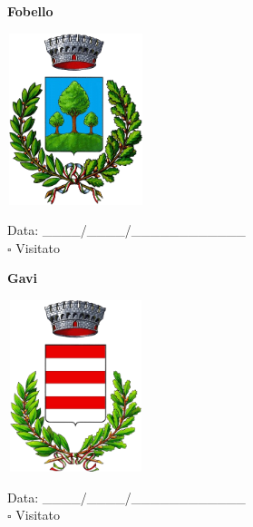\documentclass[a5paper,12pt]{article}
\begin{document}
\newpage

\noindent
\begin{minipage}[t]{0.45\textwidth}
    \begin{center}
        \textbf{Fobello}
    \end{center}
    \vspace{-0.5cm} %
    \begin{center}
        \includegraphics[height= 5cm, width=4cm]{Piemonte/Stemma Fobello.png}
    \end{center}
    \vspace{-0.4cm} %
    \begin{flushleft}
        Data: \_\_\_\_/\_\_\_\_/\_\_\_\_\_\_\_\_\_\_\_\_ \\
        $\square$ Visitato
    \end{flushleft}
\end{minipage}
\hfill
\noindent
\begin{minipage}[t]{0.45\textwidth}
    \begin{center}
        \textbf{Gavi}
    \end{center}
    \vspace{-0.5cm} %
    \begin{center}
        \includegraphics[height= 5cm, width=4cm]{Piemonte/Stemma Gavi.png}
    \end{center}
    \vspace{-0.4cm} %
    \begin{flushleft}
        Data: \_\_\_\_/\_\_\_\_/\_\_\_\_\_\_\_\_\_\_\_\_ \\
        $\square$ Visitato
    \end{flushleft}
\end{minipage}
\end{document}
